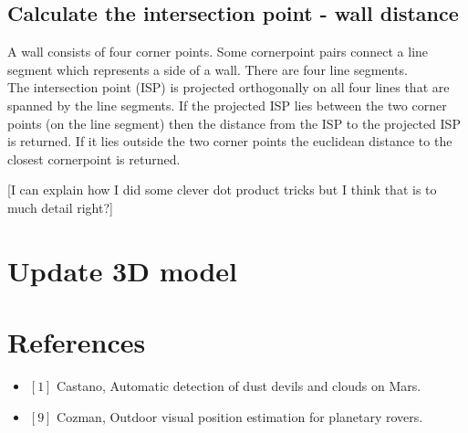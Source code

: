 \documentclass[10pt]{article}
\begin{document}
\subsection{Calculate the intersection point - wall distance}
A wall consists of four corner points. Some cornerpoint pairs connect a line segment which represents a side of a wall. There are four line segments.\\
The intersection point (ISP) is projected orthogonally on all four lines that
are spanned by the line segments.  If the projected ISP lies between the two
corner points (on the line segment) then the distance from the ISP to the
projected ISP is returned.  If it lies outside the two corner points the
euclidean distance to the closest cornerpoint is returned.

[I can explain how I did some clever dot product tricks but I think that is to much detail right?]


\section{Update 3D model}


\section{References}
\begin{itemize}
\item $[1]$ Castano, Automatic detection of dust devils and clouds on Mars.
\item $[9]$ Cozman, Outdoor visual position estimation for planetary rovers.
\end{itemize}
\end{document}
